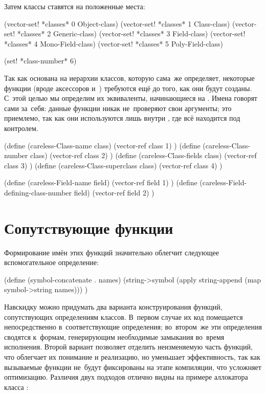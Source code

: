 Затем классы ставятся на положенные места:

\begin{code:lisp}
(vector-set! *classes* 0 Object-class)
(vector-set! *classes* 1 Class-class)
(vector-set! *classes* 2 Generic-class)
(vector-set! *classes* 3 Field-class)
(vector-set! *classes* 4 Mono-Field-class)
(vector-set! *classes* 5 Poly-Field-class)

(set! *class-number* 6)
\end{code:lisp}

Так как {\Meroonet} основана на иерархии классов, которую сама~же определяет,
некоторые функции (вроде аксессоров  и~)
требуются ещё до того, как они будут созданы. С~этой целью мы определим их
эквиваленты, начинающиеся на . Имена говорят сами за~себя: данные
функции никак не~проверяют свои аргументы; это приемлемо, так как они
используются лишь внутри {\Meroonet}, где всё находится под контролем.

\begin{code:lisp}
(define (careless-Class-name class)
  (vector-ref class 1) )
(define (careless-Class-number class)
  (vector-ref class 2) )
(define (careless-Class-fields class)
  (vector-ref class 3) )
(define (careless-Class-superclass class)
  (vector-ref class 4) )

(define (careless-Field-name field)
  (vector-ref field 1) )
(define (careless-Field-defining-class-number field)
  (vector-ref field 2) )
\end{code:lisp}


\section{Сопутствующие функции}\label{objects/sect:accomp}

Формирование имён этих функций значительно облегчит следующее вспомогательное
определение:

\begin{code:lisp}
(define (symbol-concatenate . names)
  (string->symbol (apply string-append (map symbol->string names))) )
\end{code:lisp}

Навскидку можно придумать два варианта конструирования функций, сопутствующих
определениям классов. В~первом случае их код помещается непосредственно
в~соответствующие определения; во~втором~же эти определения сводятся к~формам,
генерирующим необходимые замыкания во~время исполнения. Второй вариант позволяет
отделить неизменяемую часть функций, что облегчает их понимание и реализацию, но
уменьшает эффективность, так как вызываемые функции не~будут фиксированы на
этапе компиляции, что усложняет оптимизацию. Различия двух подходов отлично
видны на примере аллокатора класса :

